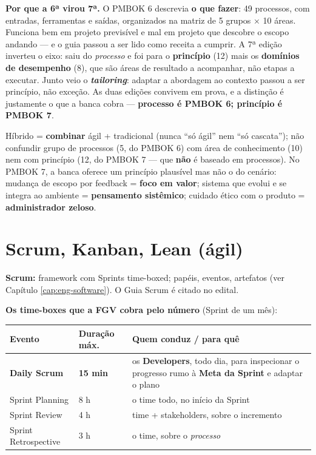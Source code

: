 \textbf{Por que a 6ª virou 7ª.} O PMBOK 6 descrevia \textbf{o que fazer}: 49
processos, com entradas, ferramentas e saídas, organizados na matriz de 5 grupos
$\times$ 10 áreas. Funciona bem em projeto previsível e mal em projeto que
descobre o escopo andando --- e o guia passou a ser lido como receita a cumprir.
A 7ª edição inverteu o eixo: saiu do \emph{processo} e foi para o
\textbf{princípio} (12) mais os \textbf{domínios de desempenho} (8), que são
áreas de resultado a acompanhar, não etapas a executar. Junto veio o
\textbf{\emph{tailoring}}: adaptar a abordagem ao contexto passou a ser
princípio, não exceção. As duas edições convivem em prova, e a distinção é
justamente o que a banca cobra --- \textbf{processo é PMBOK 6; princípio é
PMBOK 7}.

\begin{pegadinha}
Híbrido = \textbf{combinar} ágil + tradicional (nunca ``só ágil'' nem ``só
cascata''); não confundir grupo de processos (5, do PMBOK 6) com área de
conhecimento (10) nem com princípio (12, do PMBOK 7 --- que \textbf{não} é
baseado em processos). No PMBOK 7, a banca oferece um princípio plausível mas
não o do cenário: mudança de escopo por feedback = \textbf{foco em valor};
sistema que evolui e se integra ao ambiente = \textbf{pensamento sistêmico};
cuidado ético com o produto = \textbf{administrador zeloso}.
\end{pegadinha}

\section{Scrum, Kanban, Lean (ágil)}

\textbf{Scrum:} framework com Sprints time-boxed; papéis, eventos, artefatos
(ver Capítulo \ref{cap:eng-software}). O Guia Scrum é citado no edital.

\textbf{Os time-boxes que a FGV cobra pelo número} (Sprint de um mês):

\begin{center}
\begin{tabular}{@{}p{4.4cm}p{2.2cm}p{4.4cm}@{}}
\toprule
\textbf{Evento} & \textbf{Duração máx.} & \textbf{Quem conduz / para quê} \\
\midrule
\textbf{Daily Scrum} & \textbf{15 min} & os \textbf{Developers}, todo dia, para inspecionar o progresso rumo à \textbf{Meta da Sprint} e adaptar o plano \\
Sprint Planning & 8 h & o time todo, no início da Sprint \\
Sprint Review & 4 h & time + stakeholders, sobre o incremento \\
Sprint Retrospective & 3 h & o time, sobre o \emph{processo} \\
\bottomrule
\end{tabular}
\end{center}

